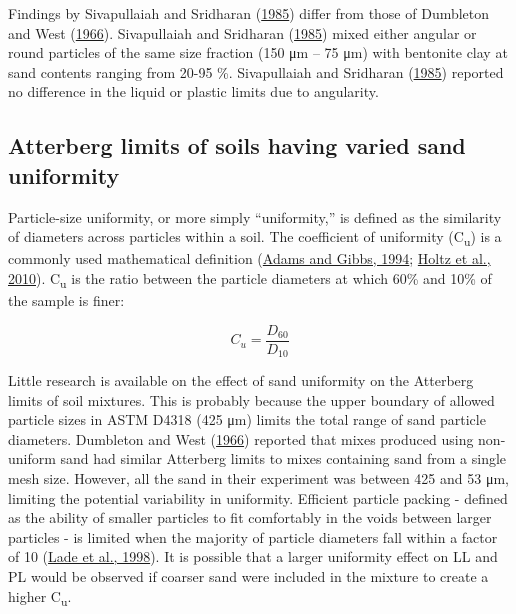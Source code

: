 \documentclass[
  letterpaper,
]{article}
\begin{document}
Findings by Sivapullaiah and Sridharan (\protect\hyperlink{ref-Sivapullaiah1985}{1985}) differ from those of Dumbleton and West (\protect\hyperlink{ref-Dumbleton1966b}{1966}).
Sivapullaiah and Sridharan (\protect\hyperlink{ref-Sivapullaiah1985}{1985}) mixed either angular or round particles of the same size fraction (150 μm -- 75 μm) with bentonite clay at sand contents ranging from 20-95 \%.
Sivapullaiah and Sridharan (\protect\hyperlink{ref-Sivapullaiah1985}{1985}) reported no difference in the liquid or plastic limits due to angularity.

\hypertarget{atterberg-limits-of-soils-having-varied-sand-uniformity}{%
\subsection{Atterberg limits of soils having varied sand uniformity}\label{atterberg-limits-of-soils-having-varied-sand-uniformity}}

Particle-size uniformity, or more simply ``uniformity,'' is defined as the similarity of diameters across particles within a soil.
The coefficient of uniformity (C\textsubscript{u}) is a commonly used mathematical definition (\protect\hyperlink{ref-Adams1994}{Adams and Gibbs, 1994}; \protect\hyperlink{ref-Holtz2010}{Holtz et al., 2010}).
C\textsubscript{u} is the ratio between the particle diameters at which 60\% and 10\% of the sample is finer:

\begin{equation}
C_u = \frac{D_{60}}{D_{10}}
\label{eq:Cu-equation}
\end{equation}

Little research is available on the effect of sand uniformity on the Atterberg limits of soil mixtures.
This is probably because the upper boundary of allowed particle sizes in ASTM D4318 (425 μm) limits the total range of sand particle diameters.
Dumbleton and West (\protect\hyperlink{ref-Dumbleton1966b}{1966}) reported that mixes produced using non-uniform sand had similar Atterberg limits to mixes containing sand from a single mesh size.
However, all the sand in their experiment was between 425 and 53 μm, limiting the potential variability in uniformity.
Efficient particle packing - defined as the ability of smaller particles to fit comfortably in the voids between larger particles - is limited when the majority of particle diameters fall within a factor of 10 (\protect\hyperlink{ref-Lade1998}{Lade et al., 1998}).
It is possible that a larger uniformity effect on LL and PL would be observed if coarser sand were included in the mixture to create a higher C\textsubscript{u}.
\end{document}
